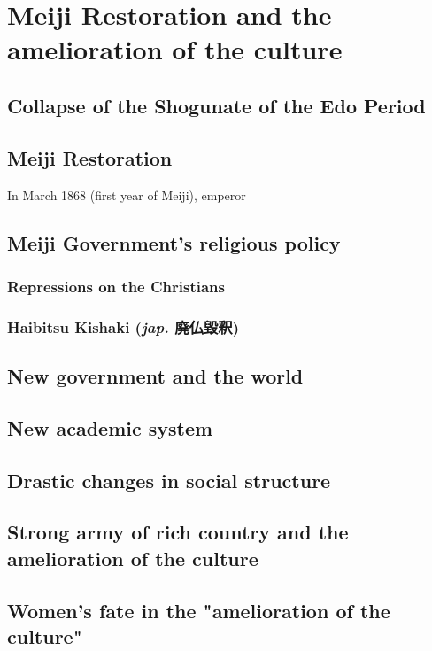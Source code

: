 \documentclass[11pt]{book}
\begin{document}
\chapter{Meiji Restoration and the amelioration of the culture}
\section{Collapse of the Shogunate of the Edo Period}
\section{Meiji Restoration}%
In March 1868 (first year of Meiji), emperor
 
\section{Meiji Government's religious policy}%
\subsection{Repressions on the Christians}
\subsection{Haibitsu Kishaki (\textit{jap.} 廃仏毀釈)}

\section{New government and the world}

\section{New academic system}%
\section{Drastic changes in social structure}%
\section{Strong army of rich country and the amelioration of the culture}%
\section{Women's fate in the "amelioration of the culture"}%
\end{document}
